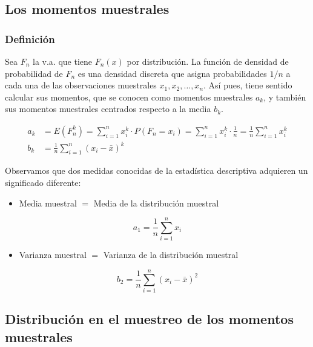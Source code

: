 \documentclass[
]{article}
\providecommand{\tightlist}{%
  \setlength{\itemsep}{0pt}\setlength{\parskip}{0pt}}
\begin{document}
\subsection{Los momentos muestrales}\label{los-momentos-muestrales}

\subsubsection{Definición}\label{definiciuxf3n-3}

Sea \(F_{n}\) la v.a. que tiene \(F_{n}(x)\) por distribución. La función de densidad de probabilidad de \(F_{n}\) es una densidad discreta que asigna probabilidades \(1 / n\) a cada una de las observaciones muestrales \(x_{1}, x_{2}, \ldots, x_{n}\). Así pues, tiene sentido calcular sus momentos, que se conocen como momentos muestrales \(a_{k}\), y también sus momentos muestrales centrados respecto a la media \(b_{k}\).

\[
\begin{aligned}
a_{k} & =E\left(F_{n}^{k}\right)=\sum_{i=1}^{n} x_{i}^{k} \cdot P\left(F_{n}=x_{i}\right)=\sum_{i=1}^{n} x_{i}^{k} \cdot \frac{1}{n}=\frac{1}{n} \sum_{i=1}^{n} x_{i}^{k} \\
b_{k} & =\frac{1}{n} \sum_{i=1}^{n}\left(x_{i}-\bar{x}\right)^{k}
\end{aligned}
\]

Observamos que dos medidas conocidas de la estadística descriptiva adquieren un significado diferente:

\begin{itemize}
\tightlist
\item
  Media muestral \(=\) Media de la distribución muestral
\end{itemize}

\[
a_{1}=\frac{1}{n} \sum_{i=1}^{n} x_{i}
\]

\begin{itemize}
\tightlist
\item
  Varianza muestral \(=\) Varianza de la distribución muestral
\end{itemize}

\[
b_{2}=\frac{1}{n} \sum_{i=1}^{n}\left(x_{i}-\bar{x}\right)^{2}
\]

\subsection{Distribución en el muestreo de los momentos muestrales}\label{distribuciuxf3n-en-el-muestreo-de-los-momentos-muestrales}
\end{document}
